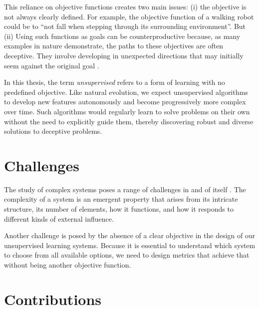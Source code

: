 This reliance on objective functions creates two main issues: (i) the objective
is not always clearly defined. For example, the objective function of a walking
robot could be to ``not fall when stepping through its surrounding
environment''. But (ii) Using such functions as goals can be counterproductive
because, as many examples in nature demonstrate, the paths to these objectives are
often deceptive. They involve developing in unexpected directions that may
initially seem against the original goal \cite{stanleyWhyGreatnessCannot2015}.

In this thesis, the term \emph{unsupervised} refers to a form of learning with
no predefined objective. Like natural evolution, we expect unsupervised
algorithms to develop new features autonomously and become progressively more
complex over time. Such algorithms would regularly learn to solve problems on
their own without the need to explicitly guide them, thereby discovering robust
and diverse solutions to deceptive problems.


\section{Challenges}

The study of complex systems poses a range of challenges in and of itself
\cite{sanmiguelChallengesComplexSystems2012}. The complexity of a system is an
emergent property that arises from its intricate structure, its number of
elements, how it functions, and how it responds to different kinds of external
influence.

Another challenge is posed by the absence of a clear objective in the design of
our unsupervised learning systems. Because it is essential to understand which
system to choose from all available options, we need to design metrics that
achieve that without being another objective function.

\section{Contributions}

